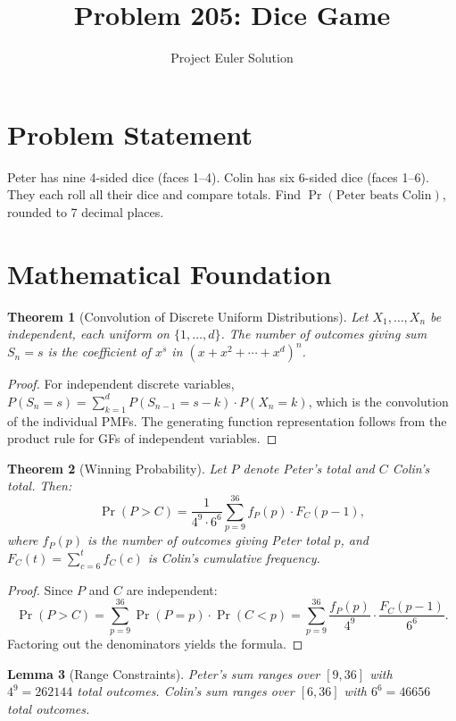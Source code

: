 \documentclass[12pt]{article}
\title{Problem 205: Dice Game}
\author{Project Euler Solution}
\date{}
\newtheorem{theorem}{Theorem}
\newtheorem{lemma}[theorem]{Lemma}
\begin{document}
\maketitle

\section{Problem Statement}
Peter has nine 4-sided dice (faces 1--4). Colin has six 6-sided dice (faces 1--6).
They each roll all their dice and compare totals. Find $\Pr(\text{Peter beats Colin})$,
rounded to 7 decimal places.

\section{Mathematical Foundation}

\begin{theorem}[Convolution of Discrete Uniform Distributions]
Let $X_1, \ldots, X_n$ be independent, each uniform on $\{1, \ldots, d\}$. The number of
outcomes giving sum $S_n = s$ is the coefficient of $x^s$ in $(x + x^2 + \cdots + x^d)^n$.
\end{theorem}

\begin{proof}
For independent discrete variables, $P(S_n = s) = \sum_{k=1}^{d} P(S_{n-1} = s-k) \cdot P(X_n = k)$,
which is the convolution of the individual PMFs. The generating function representation
follows from the product rule for GFs of independent variables.
\end{proof}

\begin{theorem}[Winning Probability]
Let $P$ denote Peter's total and $C$ Colin's total. Then:
\[
\Pr(P > C) = \frac{1}{4^9 \cdot 6^6}
\sum_{p=9}^{36} f_P(p) \cdot F_C(p-1),
\]
where $f_P(p)$ is the number of outcomes giving Peter total $p$, and
$F_C(t) = \sum_{c=6}^{t} f_C(c)$ is Colin's cumulative frequency.
\end{theorem}

\begin{proof}
Since $P$ and $C$ are independent:
\[
\Pr(P > C) = \sum_{p=9}^{36} \Pr(P=p) \cdot \Pr(C < p)
= \sum_{p=9}^{36} \frac{f_P(p)}{4^9} \cdot \frac{F_C(p-1)}{6^6}.
\]
Factoring out the denominators yields the formula.
\end{proof}

\begin{lemma}[Range Constraints]
Peter's sum ranges over $[9, 36]$ with $4^9 = 262144$ total outcomes.
Colin's sum ranges over $[6, 36]$ with $6^6 = 46656$ total outcomes.
\end{lemma}
\end{document}
